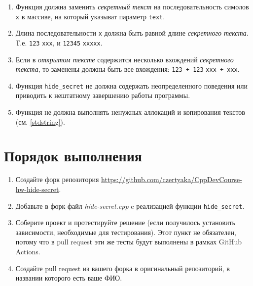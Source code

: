 \documentclass[14pt]{extarticle}
\begin{document}
        \begin{enumerate}

            \item Функция должна заменить \textit{секретный текст} на последовательность
                симолов \verb|x| в массиве, на который указыват параметр \texttt{text}.

            \item Длина последовательности \verb|x| должна быть равной длине
                \textit{секретного текста}.
                Т.е. \verb|123| \rightarrow \space \verb|xxx|, и \verb|12345|
                \rightarrow \space \verb|xxxxx|.

            \item Если в \textit{открытом тексте} содержится несколько вхождений
                \textit{секретного текста}, то заменены должны быть все вхождения:
                \verb|123 + 123| \rightarrow \space \verb|xxx + xxx|.

            \item Функция \texttt{hide\_secret} не должна содержать неопределенного
                поведения или приводить к нештатному завершению работы программы.

            \item Функция не должна выполнять ненужных аллокаций и копирования
                текстов (см. \ref{stdstring}).

        \end{enumerate}

\section{Порядок выполнения}

    \begin{enumerate}

        \item Создайте форк репозитория \url{https://github.com/czertyaka/CppDevCourse-hw-hide-secret}.

        \item Добавьте в форк файл \textit{hide-secret.cpp} c реализацией функции \texttt{hide\_secret}.

        \item Соберите проект и протестируйте решение (если получилось установить зависимости,
            необходимые для тестирования).
            Этот пункт не обязателен, потому что в pull request эти же тесты будут выполнены
            в рамках GitHub Actions.

        \item Создайте pull request из вашего форка в оригинальный репозиторий,
            в названии которого есть ваше ФИО.

    \end{enumerate}
\end{document}
